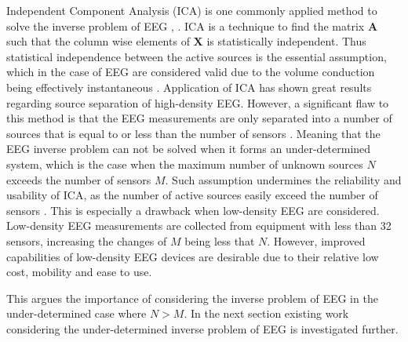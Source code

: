 Independent Component Analysis (ICA) is one commonly applied method to solve the inverse problem of EEG \cite{Scott1996}, \cite{Scott1997}. ICA is a technique to find the matrix $\mathbf{A}$ such that the column wise elements of $\mathbf{X}$ is statistically independent. Thus statistical independence between the active sources is the essential assumption, which in the case of EEG are considered valid due to the volume conduction being effectively instantaneous \cite[p. 3]{Scott1997}. 
Application of ICA has shown great results regarding source separation of high-density EEG. 
However, a significant flaw to this method is that the EEG measurements are only separated into a number of sources that is equal to or less than the number of sensors \cite{Balkan2015}.
Meaning that the EEG inverse problem can not be solved when  it forms an under-determined system, which is the case when the maximum number of unknown sources $N$ exceeds the number of sensors $M$. 
Such assumption undermines the reliability and usability of ICA, as the number of active sources easily exceed the number of sensors \cite{phd2015}. 
This is especially a drawback when low-density EEG are considered. Low-density EEG measurements are collected from equipment with less than 32 sensors, increasing the changes of $M$ being less that $N$. 
However, improved capabilities of low-density EEG devices are desirable due to their relative low cost, mobility and ease to use. 

This argues the importance of considering the inverse problem of EEG in the under-determined case where $N>M$. In the next section existing work considering the under-determined inverse problem of EEG is investigated further. 

